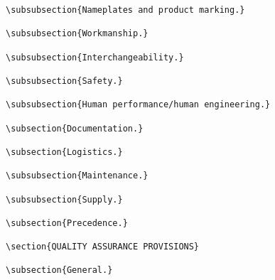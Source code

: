\begin{itemize}
\begin{small}
\begin{verbatim}
\subsubsection{Nameplates and product marking.}

\subsubsection{Workmanship.}

\subsubsection{Interchangeability.}

\subsubsection{Safety.}

\subsubsection{Human performance/human engineering.}

\subsection{Documentation.}

\subsection{Logistics.}

\subsubsection{Maintenance.}

\subsubsection{Supply.}

\subsection{Precedence.}

\section{QUALITY ASSURANCE PROVISIONS}

\subsection{General.}


\end{verbatim}
\end{small}
\end{itemize}
